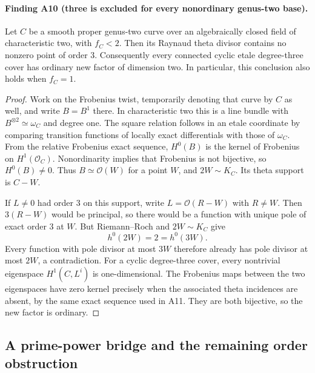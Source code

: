 \paragraph{Finding A10 (three is excluded for every nonordinary genus-two base).}
Let $C$ be a smooth proper genus-two curve over an algebraically
closed field of characteristic two, with $f_C<2$. Then its Raynaud
theta divisor contains no nonzero point of order $3$.
Consequently every connected cyclic etale degree-three cover has
ordinary new factor of dimension two. In particular, this conclusion
also holds when $f_C=1$.

\begin{proof}
Work on the Frobenius twist, temporarily denoting that curve by
$C$ as well, and write $B=B^1$ there. In
characteristic two this is a line bundle with $B^{\otimes2}\simeq
\omega_C$ and degree one. The square relation follows in an etale
coordinate by comparing transition functions of locally exact
differentials with those of $\omega_C$.
From the relative Frobenius exact sequence,
$H^0(B)$ is the kernel of Frobenius on $H^1(\mathcal O_C)$.
Nonordinarity implies that Frobenius is not bijective, so $H^0(B)\ne0$.
Thus $B\simeq\mathcal O(W)$ for a point $W$, and
$2W\sim K_C$. Its theta support is $C-W$.

If $L\ne0$ had order $3$ on this support, write
$L=\mathcal O(R-W)$ with $R\ne W$. Then $3(R-W)$ would be
principal, so there would be a function with unique pole of exact
order $3$ at $W$. But Riemann--Roch and $2W\sim K_C$ give
\[
 h^0(2W)=2=h^0(3W).
\]
Every function with pole divisor at most $3W$ therefore already has
pole divisor at most $2W$, a contradiction.
For a cyclic degree-three cover, every nontrivial eigenspace
$H^1(C,L^i)$ is one-dimensional. The Frobenius maps between the
two eigenspaces have zero kernel precisely when the associated
theta incidences are absent, by the same exact sequence used in
A11. They are both bijective, so the new factor is ordinary.
\end{proof}

\subsection{A prime-power bridge and the remaining order obstruction}
\label{sec:prime-power-bridge}


